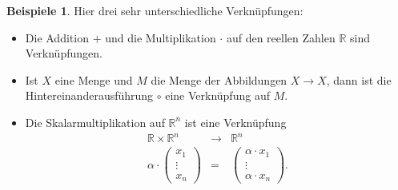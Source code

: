 \documentclass[index=totoc]{scrartcl}%
\theoremstyle{definition}
\newtheorem{bspe}[defi]{Beispiele}
\newcommand{\R}{\mathbb R}
\begin{document}
\begin{bspe}
  Hier drei sehr unterschiedliche Verknüpfungen:
  \begin{itemize}
  \item
  Die Addition $+$ und die Multiplikation $\cdot$ auf den reellen Zahlen $\R$
  sind Verknüpfungen.
  \item
  Ist $X$ eine Menge und $M$ die Menge der Abbildungen $X\to X$,
  dann ist die Hintereinanderausführung $\circ$ eine Verknüpfung auf $M$.
  \item
    Die Skalarmultiplikation auf $\R^n$ ist eine Verknüpfung
    \begin{eqnarray*}
      \R\times\R^n&\to&\R^n \\
      \alpha\cdot
      \left(\begin{array}{c}x_1\\\vdots\\x_n\end{array}\right)
                  &=&
      \left(
      \begin{array}{c}\alpha\cdot x_1\\\vdots\\\alpha\cdot x_n\end{array}
      \right).
    \end{eqnarray*}
  \end{itemize}
\end{bspe}
\end{document}
